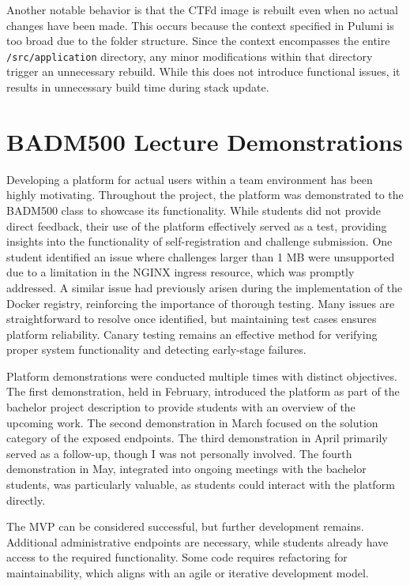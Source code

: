 Another notable behavior is that the CTFd image is rebuilt even when no actual changes have been made. This occurs because the context specified in Pulumi is too broad due to the folder structure. Since the context encompasses the entire \texttt{/src/application} directory, any minor modifications within that directory trigger an unnecessary rebuild. While this does not introduce functional issues, it results in unnecessary build time during stack update.

\section{BADM500 Lecture Demonstrations}
Developing a platform for actual users within a team environment has been highly motivating. Throughout the project, the platform was demonstrated to the BADM500 class to showcase its functionality. While students did not provide direct feedback, their use of the platform effectively served as a test, providing insights into the functionality of self-registration and challenge submission. One student identified an issue where challenges larger than 1 MB were unsupported due to a limitation in the NGINX ingress resource, which was promptly addressed. A similar issue had previously arisen during the implementation of the Docker registry, reinforcing the importance of thorough testing. Many issues are straightforward to resolve once identified, but maintaining test cases ensures platform reliability. Canary testing remains an effective method for verifying proper system functionality and detecting early-stage failures.

Platform demonstrations were conducted multiple times with distinct objectives. The first demonstration, held in February, introduced the platform as part of the bachelor project description to provide students with an overview of the upcoming work. The second demonstration in March focused on the solution category of the exposed endpoints. The third demonstration in April primarily served as a follow-up, though I was not personally involved. The fourth demonstration in May, integrated into ongoing meetings with the bachelor students, was particularly valuable, as students could interact with the platform directly.

The MVP can be considered successful, but further development remains. Additional administrative endpoints are necessary, while students already have access to the required functionality. Some code requires refactoring for maintainability, which aligns with an agile or iterative development model.

